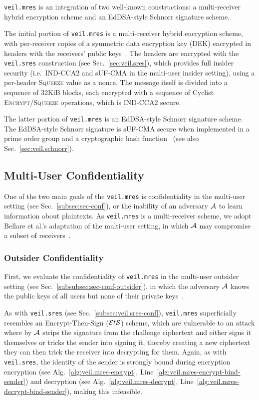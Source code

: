 \texttt{veil.mres} is an integration of two well-known constructions: a multi-receiver hybrid
encryption scheme and an EdDSA-style Schnorr signature scheme.

The initial portion of \texttt{veil.mres} is a multi-receiver hybrid encryption scheme, with
per-receiver copies of a symmetric data encryption key \@(DEK) encrypted in headers with the
receivers' public keys~\cite{kurosawa2002, bellare2003, bellare2007, rfc4880}\@.
The headers are encrypted with the \texttt{veil.sres} construction (see Sec.~\ref{sec:veil.sres}),
which provides full insider security (i.e.\ IND-CCA2 and sUF-CMA in the multi-user insider setting),
using a per-header \textsc{Squeeze} value as a nonce.
The message itself is divided into a sequence of 32KiB blocks, each encrypted with a sequence of
Cyclist \textsc{Encrypt}\@/\textsc{Squeeze} operations, which is IND-CCA2 secure.

The latter portion of \texttt{veil.mres} is an EdDSA-style Schnorr signature scheme.
The EdDSA-style Schnorr signature is sUF-CMA secure when implemented in a prime order group and a
cryptographic hash function~\cite{brendel2021, chalkias2020, pointcheval2000, neven2009} \@(see also
Sec.~\ref{sec:veil.schnorr})\@.

\subsection{Multi-User Confidentiality}\label{subsec:veil.mres-conf}

One of the two main goals of the \texttt{veil.mres} is confidentiality in the multi-user setting
(see Sec.~\ref{subsec:sec-conf}), or the inability of an adversary $\mathcal{A}$ to learn information
about plaintexts.
As \texttt{veil.mres} is a multi-receiver scheme, we adopt Bellare et al.'s adaptation of the multi-user
setting, in which $\mathcal{A}$ may compromise a subset of receivers~\cite{bellare2007}\@.

\subsubsection{Outsider Confidentiality}

First, we evaluate the confidentiality of \texttt{veil.mres} in the multi-user outsider setting (see
Sec.~\ref{subsubsec:sec-conf-outsider}), in which the adversary $\mathcal{A}$ knows the public keys
of all users but none of their private keys~\cite[p. 44]{baek2010}\@.

As with \texttt{veil.sres} \@(see Sec.~\ref{subsec:veil.sres-conf})\@, \texttt{veil.mres}
superficially resembles an Encrypt-Then-Sign ($\mathcal{E}t\mathcal{S}$) scheme, which are vulnerable to an attack
where by $\mathcal{A}$ strips the signature from the challenge ciphertext and either signs it
themselves or tricks the sender into signing it, thereby creating a new ciphertext they can then
trick the receiver into decrypting for them.
Again, as with \texttt{veil.sres}\@, the identity of the sender is strongly bound during encryption
encryption (see Alg.~\ref{alg:veil.mres-encrypt}, Line~\ref{alg:veil.mres-encrypt-bind-sender}) and
decryption (see Alg.~\ref{alg:veil.mres-decrypt}, Line~\ref{alg:veil.mres-decrypt-bind-sender}),
making this infeasible.


